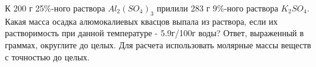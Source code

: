 
К 200 г 25$\%$-ного раствора $Al_2(SO_4)_3$ прилили 283 г $9\%$-ного раствора $K_2SO_4$. Какая масса осадка алюмокалиевых квасцов 
выпала из раствора, если их растворимость при данной температуре - 5.9г/100г воды? Ответ, выраженный в граммах, округлите до целых. Для расчета использовать молярные массы веществ с точностью до целых.




